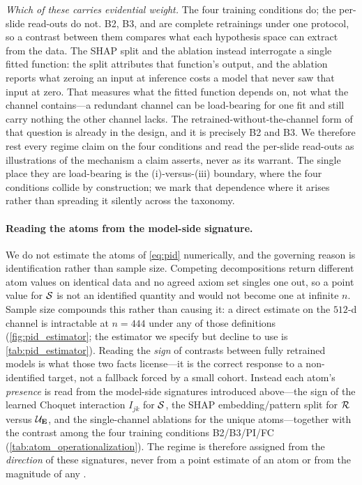 \emph{Which of these carries evidential weight.} The four training conditions
do; the per-slide read-outs do not. B2, B3, \piabmil{} and \fcmil{} are
complete retrainings under one protocol, so a contrast between them compares
what each hypothesis space can extract from the data. The SHAP split and
the ablation instead
interrogate a single fitted function: the split attributes that
function's output, and the ablation reports what zeroing an input at
inference costs a model that never saw that input at zero. That measures what
the fitted function depends on, not what the channel contains---a redundant
channel can be load-bearing for one fit and still carry nothing the other
channel lacks. The retrained-without-the-channel form of that question is
already in the design, and it is precisely B2 and B3. We therefore rest every
regime claim on the four conditions and read the per-slide read-outs as
illustrations
of the mechanism a claim asserts, never as its warrant. The single place they
are load-bearing is the (i)-versus-(iii) boundary, where the four conditions
collide by construction; we mark that dependence where it arises rather than
spreading it silently across the taxonomy.

\paragraph{Reading the atoms from the model-side signature.}
We do not estimate the atoms of \cref{eq:pid} numerically, and the governing
reason is identification rather than sample size. Competing decompositions
return different atom values on identical
data\cite{williams2010pid,bertschinger2014unique,liang2023quantifying} and no
agreed axiom set singles one out, so a point value for $\mathcal{S}$ is not an
identified quantity and would not become one at infinite $n$. Sample size
compounds this rather than causing it: a direct estimate on the $512$-d
channel is intractable at $n=444$ under any of those definitions
(\cref{fig:pid_estimator}; the estimator we specify but decline to use
is \cref{tab:pid_estimator}). Reading the
\emph{sign} of contrasts between fully retrained models is what those two
facts license---it is the correct response to a non-identified target, not a
fallback forced by a small cohort. Instead each
atom's \emph{presence} is read from the model-side signatures introduced
above---the sign of the learned Choquet interaction $I_{jk}$ for
$\mathcal{S}$, the SHAP embedding/pattern split for $\mathcal{R}$ versus
$\mathcal{U}_{\mathbf{E}}$, and the single-channel ablations for the
unique atoms---together with the contrast among the four training
conditions B2/B3/PI/FC (\cref{tab:atom_operationalization}). The regime is
therefore assigned from the
\emph{direction} of these signatures, never from a point estimate of an
atom or from the magnitude of any \auroc{}.

